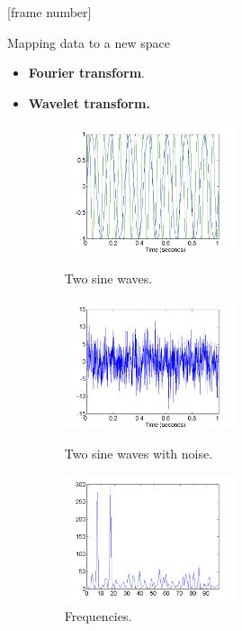 \documentclass[aspectratio=169,t]{beamer}
\begin{document}
  {
    [frame number]
    \begin{frame}{Mapping data to a new space}
    \begin{itemize}
      \item \textbf{Fourier transform}.
      \item \textbf{Wavelet transform.}

    \begin{figure}
      \centering
      \begin{minipage}[b]{0.30\textwidth}
        \includegraphics[width=5cm]{img/twosinewaves.png}
        \caption{Two sine waves.}
      \end{minipage}\hfill
      \begin{minipage}[b]{0.30\textwidth}
        \includegraphics[width=5cm]{img/twosinewaveswithnoise.png}
        \caption{Two sine waves with noise.}
      \end{minipage}\hfill
      \begin{minipage}[b]{0.30\textwidth}
        \includegraphics[width=5cm]{img/frequencies.png}
        \caption{Frequencies.}
      \end{minipage}
    \end{figure}
    \end{itemize}
    \end{frame}
  }
\end{document}
